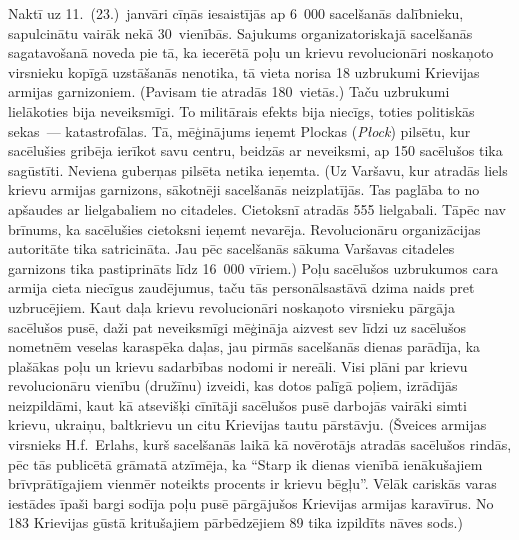 \documentclass[twoside,a5paper,12pt,fleqn,openany]{extbook}
\newcommand{\pltxti}[1]{\textit{\textpolish{#1}}}
\begin{document}
Naktī uz 11.~(23.)~janvāri cīņās iesaistījās ap 6~000 sacelšanās dalībnieku, sapulcinātu vairāk nekā 30~vienībās. Sajukums organizatoriskajā sacelšanās sagatavošanā noveda pie tā, ka iecerētā poļu un krievu revolucionāri noskaņoto virsnieku kopīgā uzstāšanās nenotika, tā vieta norisa 18 uzbrukumi Krievijas armijas garnizoniem. (Pavisam tie atradās 180~vietās.) Taču uzbrukumi lielākoties bija neveiksmīgi. To militārais efekts bija niecīgs, toties politiskās sekas~--- katastrofālas. Tā, mēģinājums ieņemt Plockas (\pltxti{Płock}) pilsētu, kur sacēlušies gribēja ierīkot savu centru, beidzās ar neveiksmi, ap 150 sacēlušos tika sagūstīti. Neviena guberņas pilsēta netika ieņemta. (Uz Varšavu, kur atradās liels krievu armijas garnizons, sākotnēji sacelšanās neizplatījās. Tas paglāba to no apšaudes ar lielgabaliem no citadeles. Cietoksnī atradās 555 lielgabali. Tāpēc nav brīnums, ka sacēlušies cietoksni ieņemt nevarēja. Revolucionāru organizācijas autoritāte tika satricināta. Jau pēc sacelšanās sākuma Varšavas citadeles garnizons tika pastiprināts līdz 16~000 vīriem.) Poļu sacēlušos uzbrukumos cara armija cieta niecīgus zaudējumus, taču tās personālsastāvā dzima naids pret uzbrucējiem. Kaut daļa krievu revolucionāri noskaņoto virsnieku pārgāja sacēlušos pusē, daži pat neveiksmīgi mēģināja aizvest sev līdzi uz sacēlušos nometnēm veselas karaspēka daļas, jau pirmās sacelšanās dienas parādīja, ka plašākas poļu un krievu sadarbības nodomi ir nereāli. Visi plāni par krievu revolucionāru vienību (družīnu) izveidi, kas dotos palīgā poļiem, izrādījās neizpildāmi, kaut kā atsevišķi cīnītāji sacēlušos pusē darbojās vairāki simti krievu, ukraiņu, baltkrievu un citu Krievijas tautu pārstāvju. (Šveices armijas virsnieks H.f.~Erlahs, kurš sacelšanās laikā kā novērotājs atradās sacēlušos rindās, pēc tās publicētā grāmatā atzīmēja, ka ``Starp ik dienas vienībā ienākušajiem brīvprātīgajiem vienmēr noteikts procents ir krievu bēgļu''. Vēlāk cariskās varas iestādes īpaši bargi sodīja poļu pusē pārgājušos Krievijas armijas karavīrus. No 183 Krievijas gūstā kritušajiem pārbēdzējiem 89 tika izpildīts nāves sods.)
\end{document}
